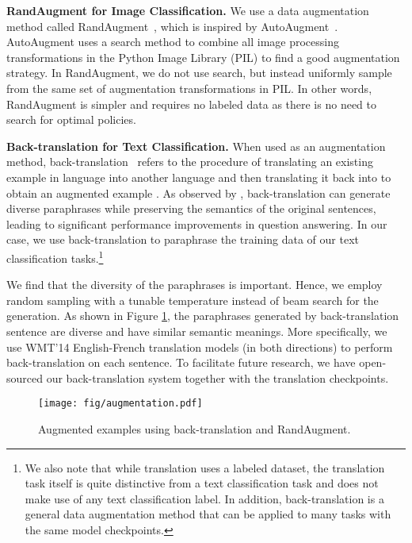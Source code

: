 \documentclass{article}
\begin{document}
\textbf{RandAugment for Image Classification.}
We use a data augmentation method called RandAugment~\cite{cubuk2019RandAugment}, which is inspired by AutoAugment~\cite{cubuk2018autoaugment}. AutoAugment uses a search method to combine all image processing transformations in the Python Image Library (PIL) to find a good augmentation strategy.
In RandAugment, we do not use search, but instead uniformly sample from the same set of augmentation transformations in PIL. In other words, RandAugment is simpler and requires no labeled data as there is no need to search for optimal policies.



\textbf{Back-translation for Text Classification.} 
When used as an augmentation method, back-translation~\cite{sennrich2015improving, edunov2018understanding} refers to the procedure of translating an existing example  in language  into another language  and then translating it back into  to obtain an augmented example .
As observed by \cite{yu2018qanet}, back-translation can generate diverse paraphrases while preserving the semantics of the original sentences, leading to significant performance improvements in question answering. 
In our case, we use back-translation to paraphrase the training data of our text classification tasks.\footnote{We also note that while translation uses a labeled dataset, the translation task itself is quite distinctive from a text classification task and does not make use of any text classification label. In addition, back-translation is a general data augmentation method that can be applied to many tasks with the same model checkpoints.}

We find that the diversity of the paraphrases is important. Hence, we employ random sampling with a tunable temperature instead of beam search for the generation. As shown in Figure \ref{fig:augmentation}, the paraphrases generated by back-translation sentence are diverse and have similar semantic meanings.
More specifically, we use WMT'14 English-French translation models (in both directions) to perform back-translation on each sentence.
To facilitate future research, we have open-sourced our back-translation system together with the translation checkpoints.



\begin{figure}[h]
\vspace{-0.7em}
    \centering
    \texttt{[image: fig/augmentation.pdf]}
    \caption{Augmented examples using back-translation and RandAugment. }
    \label{fig:augmentation}
\vspace{-0.7em}

\end{figure}
\end{document}
